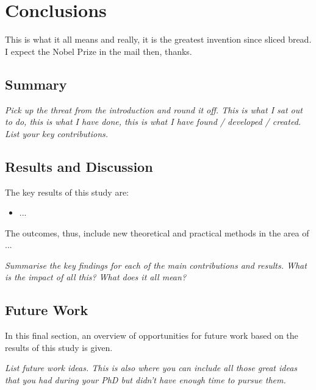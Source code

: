 %
%
\chapter{Conclusions}
\label{ch::Conclusions}
This is what it all means and really, it is the greatest invention since sliced bread. I expect the Nobel Prize in the mail then, thanks.


%
%
\section{Summary}
\label{sec::ConclusionsSummary}
\emph{Pick up the threat from the introduction and round it off. This is what I sat out to do, this is what I have done, this is what I have found / developed / created. List your key contributions.}


%
%
\section{Results and Discussion}
\label{sec::ConclusionsResultsAndDiscussion}
The key results of this study are:
%
\begin{itemize}
	\item ...
\end{itemize}
%
The outcomes, thus, include new theoretical and practical methods in the area of ...

\emph{Summarise the key findings for each of the main contributions and results. What is the impact of all this? What does it all mean?}


%
%
\section{Future Work}
\label{sec::FutureWork}
In this final section, an overview of opportunities for future work based on the results of this study is given.

\emph{List future work ideas. This is also where you can include all those great ideas that you had during your PhD but didn't have enough time to pursue them.}